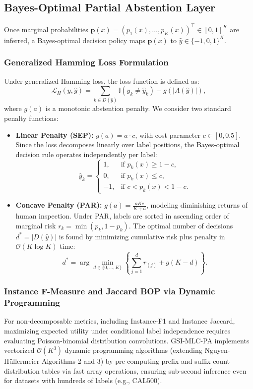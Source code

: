 \documentclass[conference]{IEEEtran}
\begin{document}
\subsection{Bayes-Optimal Partial Abstention Layer}
Once marginal probabilities $\mathbf{p}(x) = (p_1(x), \dots, p_K(x))^\top \in [0, 1]^K$ are inferred, a Bayes-optimal decision policy maps $\mathbf{p}(x)$ to $\hat{y} \in \{-1, 0, 1\}^K$.

\subsubsection{Generalized Hamming Loss Formulation}
Under generalized Hamming loss, the loss function is defined as:
\begin{equation}
    \mathcal{L}_H(y, \hat{y}) = \sum_{k \in D(\hat{y})} \mathbb{I}(y_k \neq \hat{y}_k) + g(|A(\hat{y})|),
\end{equation}
where $g(a)$ is a monotonic abstention penalty. We consider two standard penalty functions:
\begin{itemize}
    \item \textbf{Linear Penalty (SEP):} $g(a) = a \cdot c$, with cost parameter $c \in [0, 0.5]$. Since the loss decomposes linearly over label positions, the Bayes-optimal decision rule operates independently per label:
    \begin{equation}
        \hat{y}_k = \begin{cases}
            1, & \text{if } p_k(x) \ge 1 - c, \\
            0, & \text{if } p_k(x) \le c, \\
            -1, & \text{if } c < p_k(x) < 1 - c.
        \end{cases}
    \end{equation}
    \item \textbf{Concave Penalty (PAR):} $g(a) = \frac{a K c}{K + a}$, modeling diminishing returns of human inspection. Under PAR, labels are sorted in ascending order of marginal risk $r_k = \min(p_k, 1 - p_k)$. The optimal number of decisions $d^* = |D(\hat{y})|$ is found by minimizing cumulative risk plus penalty in $\mathcal{O}(K \log K)$ time:
    \begin{equation}
        d^* = \arg\min_{d \in \{0, \dots, K\}} \left\{ \sum_{j=1}^d r_{(j)} + g(K - d) \right\}.
    \end{equation}
\end{itemize}

\subsubsection{Instance F-Measure and Jaccard BOP via Dynamic Programming}
For non-decomposable metrics, including Instance-F1 and Instance Jaccard, maximizing expected utility under conditional label independence requires evaluating Poisson-binomial distribution convolutions. GSI-MLC-PA implements vectorized $\mathcal{O}(K^3)$ dynamic programming algorithms (extending Nguyen-H\"ullermeier Algorithms 2 and 3) by pre-computing prefix and suffix count distribution tables via fast array operations, ensuring sub-second inference even for datasets with hundreds of labels (e.g., CAL500).
\end{document}
